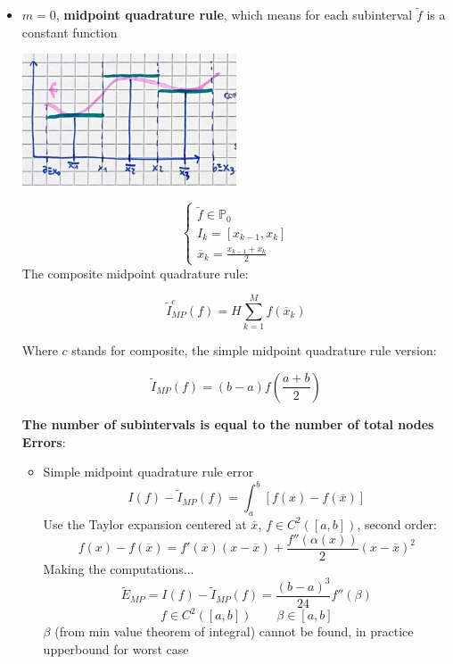 \begin{itemize}
    \item $m=0$, \textbf{midpoint quadrature rule}, which means for each subinterval $\tilde{f}$ is a constant function
    \begin{center}
        \includegraphics[width=0.5\textwidth]{images/quadrature_m0.png}
    \end{center}
    $$
    \begin{cases}
        \tilde{f}\in\mathbb{P}_0\\
        I_k=[x_{k-1},x_k]\\        
        \overline{x}_k=\frac{x_{k-1}+x_k}{2}
    \end{cases}
    $$
    The composite midpoint quadrature rule:
    \begin{LARGE}
        $$
        \tilde{I}_{MP}^c(f)=H\sum_{k=1}^Mf(\overline{x}_k)
        $$
    \end{LARGE}
    Where $c$ stands for composite, the simple midpoint quadrature rule version:
    \begin{LARGE}
        $$
        \tilde{I}_{MP}(f)=(b-a)f\left(\frac{a+b}{2}\right)
        $$
    \end{LARGE}
    \textbf{The number of subintervals is equal to the number of total nodes}\\
    \textbf{Errors}:
    \begin{itemize}
        \item Simple midpoint quadrature rule error
        $$
        I(f)-\tilde{I}_{MP}(f)=\int_a^b\left[f(x)-f(\overline{x})\right]
        $$
        Use the Taylor expansion centered at $\overline{x}$, $f\in C^2([a,b])$, second order:
        $$
        f(x)-f(\overline{x})=f'(\overline{x})(x-\overline{x})+
        \frac{f''(\alpha(x))}{2}(x-\overline{x})^2
        $$
        Making the computations...
        $$
        \tilde{E}_{MP}=I(f)-\tilde{I}_{MP}(f)=
        \frac{(b-a)^3}{24}f''(\beta)
        $$
        $$
        f\in C^2([a,b])\qquad\beta\in[a,b]
        $$
        $\beta$ (from min value theorem of integral) cannot be found, in practice upperbound for worst case

\end{itemize}
\end{itemize}
